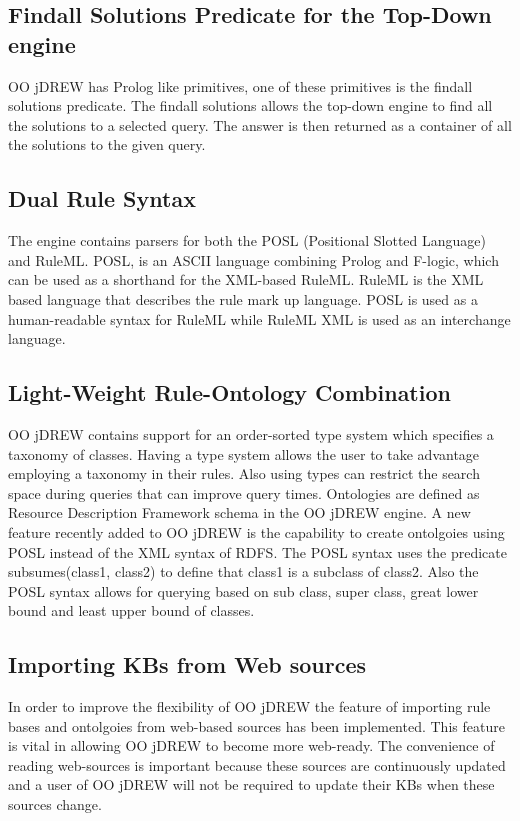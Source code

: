 \documentclass [letterpaper] {Article}
\begin{document}
\begin{small}
\subsection{Findall Solutions Predicate for the Top-Down engine}

\hspace{0.3in}OO jDREW has Prolog like primitives, one of these primitives is the findall solutions predicate. The findall solutions allows the top-down engine to find all the solutions to a selected query. The answer is then returned as a container of all the solutions to the given query.

\subsection{Dual Rule Syntax}
\hspace{0.3in}The engine contains parsers for both the POSL (Positional Slotted Language) and RuleML. POSL, is an ASCII language combining Prolog and F-logic, which can be used as a shorthand for the XML-based RuleML. RuleML is the XML based language that describes the rule mark up language. POSL is used as a human-readable syntax for RuleML while RuleML XML is used as an interchange language.


\subsection{Light-Weight Rule-Ontology Combination} 
\hspace{0.3in}OO jDREW contains support for an order-sorted type system which specifies a taxonomy of classes. Having a type system allows the user to take advantage employing a taxonomy in their rules. Also using types can restrict the search space during queries that can improve query times. Ontologies are defined as Resource Description Framework schema in the OO jDREW engine. A new feature recently added to OO jDREW is the capability to create ontolgoies using POSL instead of the XML syntax of RDFS. The POSL syntax uses the predicate subsumes(class1, class2) to define that class1 is a subclass of class2. Also the POSL syntax allows for querying based on sub class, super class, great lower bound and least upper bound of classes. 

\subsection{Importing KBs from Web sources}

\hspace{0.3in}In order to improve the flexibility of OO jDREW the feature of importing rule bases
and ontolgoies from web-based sources has been implemented.  This feature is vital in
allowing OO jDREW to become more web-ready.  The convenience of reading web-sources is
important because these sources are continuously updated and a user of OO jDREW will
not be required to update their KBs when these sources change. 


\end{small}
\end{document}

